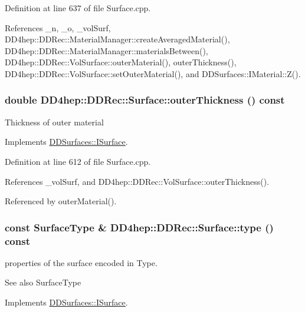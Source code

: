 Definition at line 637 of file Surface.cpp.

References \_\-n, \_\-o, \_\-volSurf, DD4hep::DDRec::MaterialManager::createAveragedMaterial(), DD4hep::DDRec::MaterialManager::materialsBetween(), DD4hep::DDRec::VolSurface::outerMaterial(), outerThickness(), DD4hep::DDRec::VolSurface::setOuterMaterial(), and DDSurfaces::IMaterial::Z().\hypertarget{class_d_d4hep_1_1_d_d_rec_1_1_surface_a1f75aae21b3cfc2fca58a8e8a340703e}{
\subsubsection[{outerThickness}]{\setlength{\rightskip}{0pt plus 5cm}double DD4hep::DDRec::Surface::outerThickness () const}}
\label{class_d_d4hep_1_1_d_d_rec_1_1_surface_a1f75aae21b3cfc2fca58a8e8a340703e}
Thickness of outer material 

Implements \hyperlink{class_d_d_surfaces_1_1_i_surface_aa2559a8904e474835c5d24c243a44909}{DDSurfaces::ISurface}.

Definition at line 612 of file Surface.cpp.

References \_\-volSurf, and DD4hep::DDRec::VolSurface::outerThickness().

Referenced by outerMaterial().\hypertarget{class_d_d4hep_1_1_d_d_rec_1_1_surface_ac2500033e175992484aba8956a27bdd6}{
\subsubsection[{type}]{\setlength{\rightskip}{0pt plus 5cm}const {\bf SurfaceType} \& DD4hep::DDRec::Surface::type () const}}
\label{class_d_d4hep_1_1_d_d_rec_1_1_surface_ac2500033e175992484aba8956a27bdd6}
properties of the surface encoded in Type. \begin{DoxySeeAlso}{See also}
SurfaceType 
\end{DoxySeeAlso}


Implements \hyperlink{class_d_d_surfaces_1_1_i_surface_aab772d11a61d7ae966d535be0da2a626}{DDSurfaces::ISurface}.


